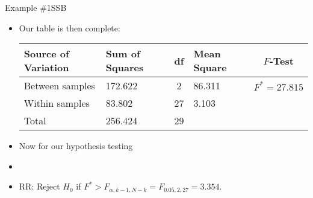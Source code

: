 \documentclass[xcolor=dvipsnames]{beamer}
\begin{document}
\begin{frame}{Example \#1}{SSB}
	\begin{itemize}
		\item Our table is then complete:
		\vspace{2mm}
		\begin{center}
			{\scriptsize
				\begin{tabular}{lp{1.2cm}cp{2.5cm}c}
					\hline 
					\textbf{Source of Variation} & \textbf{Sum of Squares} & \textbf{df} & \textbf{Mean Square} & $F$-\textbf{Test} \\ \hline 
					Between samples & 172.622 & 2 & 86.311 & $F^*=27.815$ \\
					Within samples & 83.802 & 27 &  3.103 & \\
					Total & 256.424 & 29 & & \\ \hline
			\end{tabular}}
		\end{center}
	\vspace{2mm}
	\item Now for our hypothesis testing
	\item[]
	\item RR: Reject $H_0$ if $F^* > F_{\alpha, k-1, N-k} = F_{0.05, 2, 27} =3.354 $. 
	\end{itemize}
\end{frame}
\end{document}
